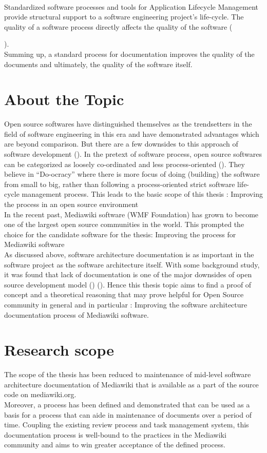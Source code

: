 \\\indent Standardized software processes and tools for Application Lifecycle Management provide structural support to a software engineering project's life-cycle. The quality of a software process directly affects the quality of the software ({\cite{Fuggeffa1988}).
\\\indent Summing up, a standard process for documentation improves the quality of the documents and ultimately, the quality of the software itself.

\section{About the Topic}\label{sec:about}
\indent Open source softwares have distinguished themselves as the trendsetters in the field of software engineering in this era and have demonstrated advantages which are beyond comparison. But there are a few downsides to this approach of software development ()\cite{Scacchi2007}. In the pretext of software process, open source softwares can be categorized as loosely co-ordinated and less process-oriented (\cite{Zhao2003}). They believe in \enquote{Do-ocracy} where there is more focus of doing (building) the software from small to big, rather than following a process-oriented strict software life-cycle management process. This leads to the basic scope of this thesis : Improving the process in an open source environment
\\\indent In the recent past, Mediawiki software (WMF Foundation) has grown to become one of the largest open source communities in the world. This prompted the choice for the candidate software for the thesis: Improving the process for Mediawiki software
\\\indent As discussed above, software architecture documentation is as important in the software project as the software architecture itself. With some background study, it was found that lack of documentation is one of the major downsides of open source development model (\cite{6923128}) (\cite{Zhao2003}). Hence this thesis topic aims to find a proof of concept  and a theoretical reasoning that may prove helpful for Open Source community in general and in particular : Improving the software architecture documentation process of Mediawiki software.

\section{Research scope}\label{sec:scope}
The scope of the thesis has been reduced to maintenance of mid-level software architecture documentation of Mediawiki that is available as a part of the source code on mediawiki.org.
\\\indent Moreover, a process has been defined and demonstrated that can be used as a basis for a process that can aide in maintenance of documents over a period of time. Coupling the existing review process and task management system, this documentation process is well-bound to the practices in the Mediawiki community and aims to win greater acceptance of the defined process. \cite{6923128}

}
